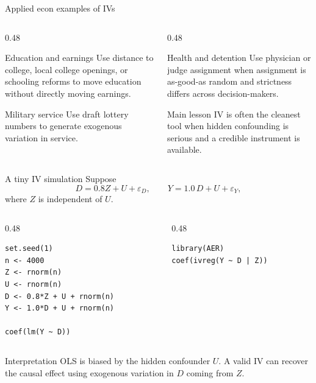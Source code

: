 \documentclass[dvipsnames,aspectratio=169,handout]{beamer}
\begin{document}
\begin{frame}{Applied econ examples of IVs}
\begin{columns}[T]
\begin{column}{0.48\textwidth}
\begin{block}{Education and earnings}
Use distance to college, local college openings, or schooling reforms to move education without directly moving earnings.
\end{block}

\begin{block}{Military service}
Use draft lottery numbers to generate exogenous variation in service.
\end{block}
\end{column}
\begin{column}{0.48\textwidth}
\begin{block}{Health and detention}
Use physician or judge assignment when assignment is as-good-as random and strictness differs across decision-makers.
\end{block}

\begin{block}{Main lesson}
IV is often the cleanest tool when hidden confounding is serious and a credible instrument is available.
\end{block}
\end{column}
\end{columns}
\end{frame}

\begin{frame}[fragile]{A tiny IV simulation}
Suppose
\[
D = 0.8 Z + U + \varepsilon_D,
\qquad
Y = 1.0\, D + U + \varepsilon_Y,
\]
where $Z$ is independent of $U$.

\begin{columns}[T,onlytextwidth]
\begin{column}{0.48\textwidth}
\begin{lstlisting}
set.seed(1)
n <- 4000
Z <- rnorm(n)
U <- rnorm(n)
D <- 0.8*Z + U + rnorm(n)
Y <- 1.0*D + U + rnorm(n)

coef(lm(Y ~ D))
\end{lstlisting}
\end{column}
\begin{column}{0.48\textwidth}
\begin{lstlisting}
library(AER)
coef(ivreg(Y ~ D | Z))
\end{lstlisting}
\end{column}
\end{columns}

\begin{alertblock}{Interpretation}
OLS is biased by the hidden confounder $U$. A valid IV can recover the causal effect using exogenous variation in $D$ coming from $Z$.
\end{alertblock}
\end{frame}
\end{document}
